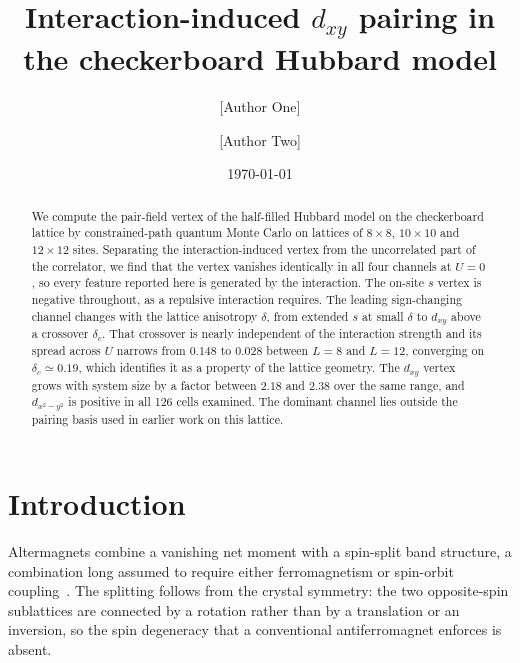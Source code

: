 \documentclass[aps,prb,reprint,superscriptaddress,amsmath,amssymb,floatfix]{revtex4-2}
\begin{document}
\title{Interaction-induced $d_{xy}$ pairing in the checkerboard Hubbard model}

\author{[Author One]}
\affiliation{[Affiliation]}
\author{[Author Two]}
\affiliation{[Affiliation]}

\date{\today}

\begin{abstract}
We compute the pair-field vertex of the half-filled Hubbard model on the
checkerboard lattice by constrained-path quantum Monte Carlo on lattices of
$8\times8$, $10\times10$ and $12\times12$ sites. Separating the
interaction-induced vertex from the uncorrelated part of the correlator, we find
that the vertex vanishes identically in all four channels at $U=0$, so every
feature reported here is generated by the interaction. The on-site $s$ vertex is
negative throughout, as a repulsive interaction requires. The leading
sign-changing channel changes with the lattice anisotropy $\delta$, from
extended $s$ at small $\delta$ to $d_{xy}$ above a crossover $\delta_c$. That
crossover is nearly independent of the interaction strength and its spread
across $U$ narrows from $0.148$ to $0.028$ between $L=8$ and $L=12$, converging
on $\delta_c \simeq 0.19$, which identifies it as a property of the lattice
geometry. The $d_{xy}$ vertex grows with system size by a factor between $2.18$
and $2.38$ over the same range, and $d_{x^2-y^2}$ is positive in all 126 cells
examined. The dominant channel lies outside the pairing basis used in earlier
work on this lattice.
\end{abstract}

\maketitle


\section{Introduction}

Altermagnets combine a vanishing net moment with a spin-split band structure,
a combination long assumed to require either ferromagnetism or spin-orbit
coupling~\cite{Smejkal2022a,Smejkal2022b}. The splitting follows from the
crystal symmetry: the two opposite-spin sublattices are connected by a rotation
rather than by a translation or an inversion, so the spin degeneracy that a
conventional antiferromagnet enforces is absent.
\end{document}
